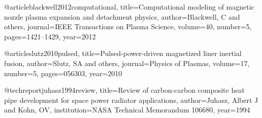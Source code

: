 \documentclass[10pt,3p,twocolumn]{article}
\begin{document}
@article{blackwell2012computational,
  title={Computational modeling of magnetic nozzle plasma expansion and detachment physics},
  author={Blackwell, C and others},
  journal={IEEE Transactions on Plasma Science},
  volume={40},
  number={5},
  pages={1421--1429},
  year={2012}
}

@article{slutz2010pulsed,
  title={Pulsed-power-driven magnetized liner inertial fusion},
  author={Slutz, SA and others},
  journal={Physics of Plasmas},
  volume={17},
  number={5},
  pages={056303},
  year={2010}
}

@techreport{juhasz1994review,
  title={Review of carbon-carbon composite heat pipe development for space power radiator applications},
  author={Juhasz, Albert J and Kohn, OV},
  institution={NASA Technical Memorandum 106680},
  year={1994}
}
\end{document}
